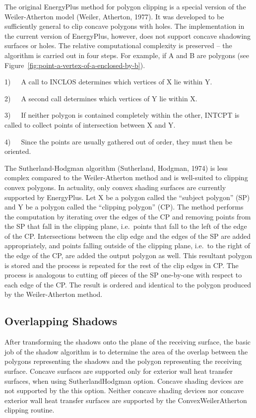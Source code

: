 The original EnergyPlus method for polygon clipping is a special version of the Weiler-Atherton model (Weiler, Atherton, 1977). It was developed to be sufficiently general to clip concave polygons with holes. The implementation in the current version of EnergyPlus, however, does not support concave shadowing surfaces or holes. The relative computational complexity is preserved -- the algorithm is carried out in four steps. For example, if A and B are polygons (see Figure~\ref{fig:point-a-vertex-of-a-enclosed-by-b}).

1)~~~A call to INCLOS determines which vertices of X lie within Y.

2)~~~A second call determines which vertices of Y lie within X.

3)~~~If neither polygon is contained completely within the other, INTCPT is called to collect points of intersection between X and Y.

4)~~~Since the points are usually gathered out of order, they must then be oriented.

The Sutherland-Hodgman algorithm (Sutherland, Hodgman, 1974) is less complex compared to the Weiler-Atherton method and is well-suited to clipping convex polygons. In actuality, only convex shading surfaces are currently supported by EnergyPlus. Let X be a polygon called the ``subject polygon'' (SP) and Y be a polygon called the ``clipping polygon'' (CP). The method performs the computation by iterating over the edges of the CP and removing points from the SP that fall in the clipping plane, i.e.~points that fall to the left of the edge of the CP. Intersections between the clip edge and the edges of the SP are added appropriately, and points falling outside of the clipping plane, i.e.~to the right of the edge of the CP, are added the output polygon as well. This resultant polygon is stored and the process is repeated for the rest of the clip edges in CP. The process is analogous to cutting off pieces of the SP one-by-one with respect to each edge of the CP. The result is ordered and identical to the polygon produced by the Weiler-Atherton method.

\subsection{Overlapping Shadows}\label{overlapping-shadows}

After transforming the shadows onto the plane of the receiving surface, the basic job of the shadow algorithm is to determine the area of the overlap between the polygons representing the shadows and the polygon representing the receiving surface. Concave surfaces are supported only for exterior wall heat transfer surfaces, when using SutherlandHodgman option. Concave shading devices are not supported by the this option. Neither concave shading devices nor concave exterior wall heat transfer surfaces are supported by the ConvexWeilerAtherton clipping routine.

